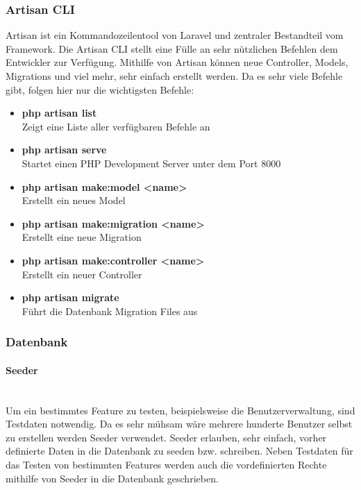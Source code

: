 \subsubsection{Artisan CLI}
Artisan ist ein Kommandozeilentool von Laravel und zentraler Bestandteil vom Framework. Die
Artisan CLI
stellt eine Fülle an sehr nützlichen Befehlen dem Entwickler zur Verfügung.
Mithilfe von Artisan können neue Controller, Models, Migrations und viel mehr, sehr
einfach erstellt werden. Da es sehr viele Befehle gibt, folgen hier nur die
wichtigsten Befehle:

\begin{itemize}
  \item \textbf{php artisan list}\\
  Zeigt eine Liste aller verfügbaren Befehle an
  \item \textbf{php artisan serve}\\
  Startet einen PHP Development Server unter dem Port 8000
  \item \textbf{php artisan make:model <name>}\\
  Erstellt ein neues Model
  \item \textbf{php artisan make:migration <name>}\\
  Erstellt eine neue Migration
  \item \textbf{php artisan make:controller <name>}\\
  Erstellt ein neuer Controller
  \item \textbf{php artisan migrate}\\
  Führt die Datenbank Migration Files aus
\end{itemize}

\subsubsection{Datenbank}

\paragraph{Seeder}\mbox{}\\
Um ein bestimmtes Feature zu testen, beispielsweise die Benutzerverwaltung, sind
Testdaten notwendig. Da es sehr mühsam wäre mehrere hunderte Benutzer selbst zu
erstellen werden Seeder verwendet. Seeder erlauben, sehr einfach, vorher
definierte Daten in die Datenbank zu seeden bzw. schreiben. Neben Testdaten für
das Testen von bestimmten Features werden auch die vordefinierten Rechte
mithilfe von Seeder in die Datenbank geschrieben.\\

